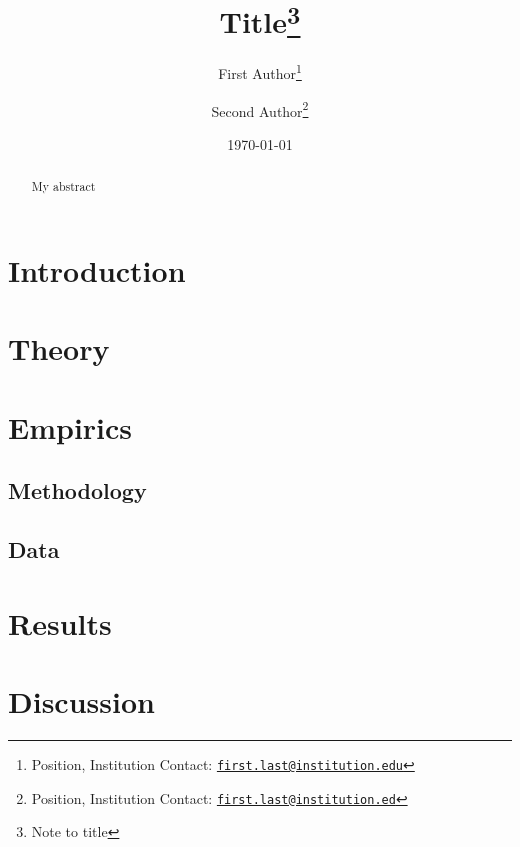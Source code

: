 \documentclass{article}
\title{Title\footnote{Note to title}}
\author{First  Author\footnote{Position, Institution Contact: \texttt{\href{mailto:first.last@institution.edu}{first.last@institution.edu}}}
\and
Second  Author\footnote{Position, Institution Contact:  \texttt{\href{mailto:first.last@institution.ed}{first.last@institution.ed}}}}
\date{\today}
\begin{document}
\maketitle

\begin{abstract}
My abstract
\end{abstract}


\newpage
\tableofcontents

\newpage
\section{Introduction}
\label{sec:intro}



\newpage
\section{Theory}
\label{sec:theory}



\newpage
\section{Empirics}
\label{sec:empirics}

\subsection{Methodology}
\label{sec:methods}


\subsection{Data}
\label{sec:data}


\newpage
\section{Results}
\label{sec:results}



\newpage
\section{Discussion}
\label{sec:discussion}


\newpage


\end{document}
